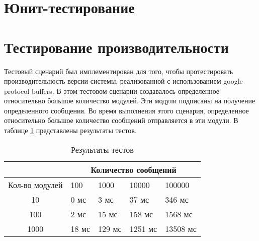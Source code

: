 \section{Юнит-тестирование}

\section{Тестирование производительности}
Тестовый сценарий был имплементирован для того, чтобы протестировать производительность версии системы, реализованной с использованием google protocol buffers. В этом тестовом сценарии создавалось определенное относительно большое количество модулей. Эти модули подписаны на получение определенного сообщения. Во время выполнения этого сценария, определенное относительно большое количество сообщений отправляется в эти модули. В таблице \ref{tab:sync_bench} представлены результаты тестов.

\begin{table}
    \caption{\label{tab:sync_bench}Результаты тестов}
    \begin{center}
        \begin{tabularx}{\textwidth}{|c|X|X|X|X|}
            \hline
            & \multicolumn{4}{|c|}{Количество сообщений} \\
            \hline
            Кол-во модулей & 100   & 1000   & 10000   & 100000   \\
            \hline
            10             & 0 мс  & 3 мс   & 37 мс   & 346 мс   \\
            \hline
            100            & 2 мс  & 15 мс  & 158 мс  & 1568 мс  \\
            \hline
            1000           & 18 мс & 129 мс & 1251 мс & 13508 мс \\
            \hline
        \end{tabularx}
    \end{center}
\end{table}


